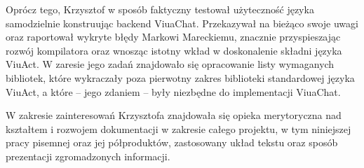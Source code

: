 Oprócz tego, Krzysztof w sposób faktyczny testował użyteczność języka
\ViuAct\, samodzielnie konstruując backend ViuaChat. Przekazywał na bieżąco
swoje uwagi oraz raportował wykryte błędy Markowi Mareckiemu, znacznie
przyspieszając rozwój kompilatora oraz wnosząc istotny wkład w doskonalenie
składni języka ViuAct. W zaresie jego zadań znajdowało się opracowanie listy
wymaganych bibliotek, które wykraczały poza pierwotny zakres biblioteki
standardowej języka ViuAct, a które -- jego zdaniem -- były niezbędne
do implementacji ViuaChat.

W zakresie zainteresowań Krzysztofa znajdowała się opieka merytoryczna nad
kształtem i rozwojem dokumentacji w zakresie całego projektu, w tym niniejszej
pracy pisemnej oraz jej półproduktów, zastosowany układ tekstu oraz sposób
prezentacji zgromadzonych informacji.
